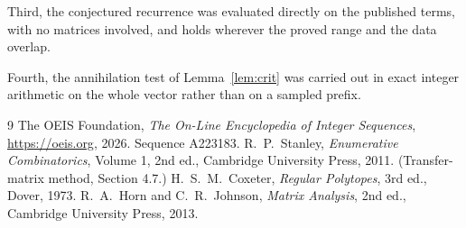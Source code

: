 \documentclass[11pt,a4paper]{article}
\theoremstyle{plain}
\theoremstyle{definition}
\begin{document}
Third, the conjectured recurrence was evaluated directly on the published terms, with no
matrices involved, and holds wherever the proved range and the data overlap.

Fourth, the annihilation test of Lemma~\ref{lem:crit} was carried out in exact integer
arithmetic on the whole vector rather than on a sampled prefix.

\begin{thebibliography}{9}
 The OEIS Foundation, \emph{The On-Line Encyclopedia of Integer
Sequences}, \url{https://oeis.org}, 2026. Sequence A223183.
 R.~P.~Stanley, \emph{Enumerative Combinatorics}, Volume 1, 2nd ed.,
Cambridge University Press, 2011. (Transfer-matrix method, Section 4.7.)
 H.~S.~M.~Coxeter, \emph{Regular Polytopes}, 3rd ed., Dover, 1973.
 R.~A.~Horn and C.~R.~Johnson, \emph{Matrix Analysis}, 2nd ed., Cambridge
University Press, 2013.
\end{thebibliography}
\end{document}
